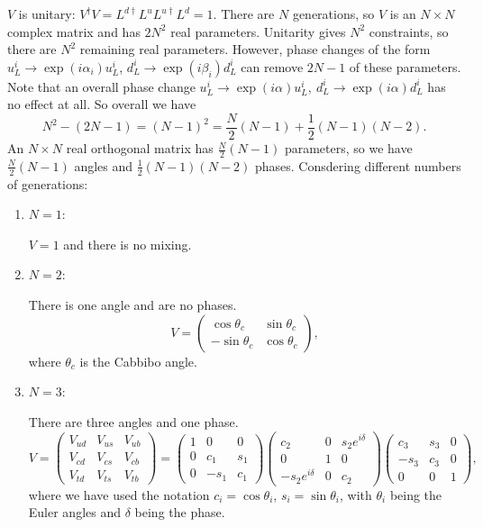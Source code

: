 $V$ is unitary: $V^\dagger V = L^{d \dagger}L^u L^{u \dagger} L^d = 1$. There are $N$ generations, so $V$ is an $N\times N$ complex matrix and has $2N^2$ real parameters. Unitarity gives $N^2$ constraints, so there are $N^2$ remaining real parameters. However, phase changes of the form $u_L^i \to \exp(i\alpha_i)u_L^i$, $d_L^i \to \exp(i\beta_i)d_L^i$ can remove $ 2N-1$ of these parameters. Note that an overall phase change $u_L^i \to \exp(i\alpha)u_L^i,\ d_L^i \to \exp(i\alpha)d_L^i$ has no effect at all. So overall we have 
\begin{equation}
N^2 - (2N-1) = (N-1)^2 = \frac{N}{2}(N-1) + \frac{1}{2}(N-1)(N-2).
\end{equation}
An $N\times N$ real orthogonal matrix has $\frac{N}{2}(N-1)$ parameters, so we have $\frac{N}{2}(N-1)$ angles and $\frac{1}{2}(N-1)(N-2)$ phases. Consdering different numbers of generations:
\begin{enumerate}
\item $N=1$:

$V=1$ and there is no mixing.
\item $N=2$:

There is one angle and are no phases.
\begin{equation}
V = \begin{pmatrix}
\cos\theta_c & \sin\theta_c \\
-\sin\theta_c & \cos\theta_c
\end{pmatrix},
\end{equation}
where $\theta_c$ is the Cabbibo angle.
\item $N=3$:

There are three angles and one phase.
\begin{equation}
V = \begin{pmatrix}
V_{ud} & V_{us} & V_{ub} \\
V_{cd} & V_{cs} & V_{cb} \\
V_{td} & V_{ts} & V_{tb} 
\end{pmatrix} =
\begin{pmatrix}
1 & 0 & 0 \\
0 & c_1 & s_1 \\
0 & -s_1 & c_1 
\end{pmatrix}
\begin{pmatrix}
c_2 & 0 & s_2e^{i\delta} \\
0 & 1 & 0 \\
-s_2 e^{i\delta} & 0 & c_2
\end{pmatrix}
\begin{pmatrix}
c_3 & s_3 & 0 \\
-s_3 & c_3 & 0 \\
0 & 0 & 1
\end{pmatrix},
\end{equation}
where we have used the notation $c_i = \cos\theta_i$, $s_i = \sin\theta_i$, with $\theta_i$ being the Euler angles and $\delta$ being the phase.
\end{enumerate}
